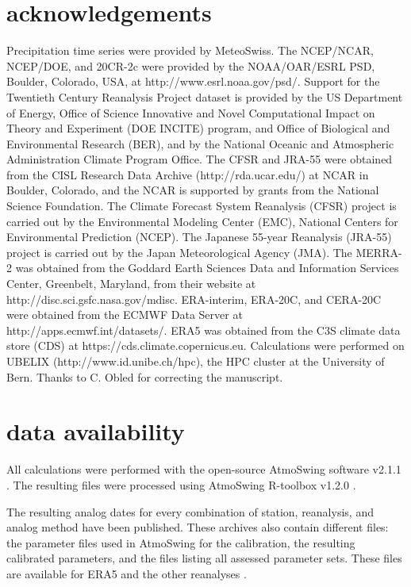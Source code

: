 \documentclass[alpha-refs]{wiley-article}
\begin{document}
\section*{acknowledgements}
Precipitation time series were provided by MeteoSwiss. The NCEP/NCAR, NCEP/DOE, and 20CR-2c were provided by the NOAA/OAR/ESRL PSD, Boulder, Colorado, USA, at http://www.esrl.noaa.gov/psd/. Support for the Twentieth Century Reanalysis Project dataset is provided by the US Department of Energy, Office of Science Innovative and Novel Computational Impact on Theory and Experiment (DOE INCITE) program, and Office of Biological and Environmental Research (BER), and by the National Oceanic and Atmospheric Administration Climate Program Office. The CFSR and JRA-55 were obtained from the CISL Research Data Archive (http://rda.ucar.edu/) at NCAR in Boulder, Colorado, and the NCAR is supported by grants from the National Science Foundation. The Climate Forecast System Reanalysis (CFSR) project is carried out by the Environmental Modeling Center (EMC), National Centers for Environmental Prediction (NCEP). The Japanese 55-year Reanalysis (JRA-55) project is carried out by the Japan Meteorological Agency (JMA). The MERRA-2 was obtained from the Goddard Earth Sciences Data and Information Services Center, Greenbelt, Maryland, from their website at http://disc.sci.gsfc.nasa.gov/mdisc. ERA-interim, ERA-20C, and CERA-20C were obtained from the ECMWF Data Server at http://apps.ecmwf.int/datasets/. ERA5 was obtained from the C3S climate data store (CDS) at https://cds.climate.copernicus.eu. Calculations were performed on UBELIX (http://www.id.unibe.ch/hpc), the HPC cluster at the University of Bern. Thanks to C. Obled for correcting the manuscript.


\section*{data availability}
All calculations were performed with the open-source AtmoSwing software v2.1.1 \citep{Horton2019c}. The resulting files were processed using AtmoSwing R-toolbox v1.2.0 \citep{Horton2018d}.

The resulting analog dates for every combination of station, reanalysis, and analog method have been published. These archives also contain different files: the parameter files used in AtmoSwing for the calibration, the resulting calibrated parameters, and the files listing all assessed parameter sets. These files are available for ERA5 \citep{Horton2021} and the other reanalyses \citep[see references in][]{Horton2018b}.
\end{document}
